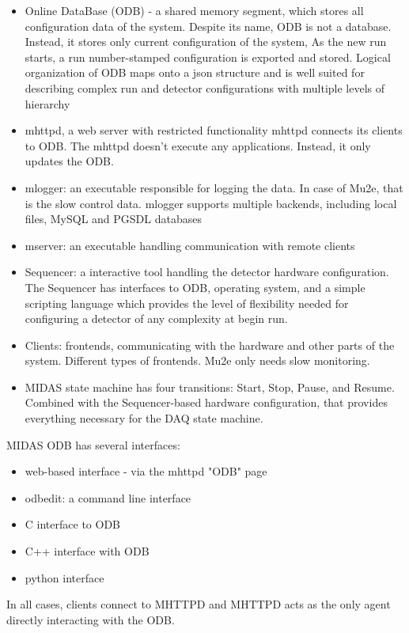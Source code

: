 \begin{itemize}
\item
  Online DataBase (ODB) - a shared memory segment, which stores all configuration data of the system.
  Despite its name, ODB is not a database. Instead, it stores only current configuration
  of the system, As the new run starts, a run number-stamped configuration is exported and stored.
  Logical organization of ODB maps onto a json structure and is well suited for describing
  complex run and detector configurations with multiple levels of hierarchy
\item 
  mhttpd, a web server with restricted functionality
  mhttpd connects its clients to ODB. 
  The mhttpd doesn't execute any applications. Instead, it only updates the ODB.
\item
  mlogger: an executable responsible for logging the data. In case of Mu2e, that is the slow control data.
  mlogger supports multiple backends, including local files, MySQL and PGSDL databases
\item
  mserver: an executable handling communication with remote clients
\item
  Sequencer: a interactive tool handling the detector hardware configuration.
  The Sequencer has interfaces to ODB, operating system, and a simple scripting language
  which provides the level of flexibility needed for configuring a detector of any complexity
  at begin run.
\item
  Clients: frontends, communicating with the hardware and other
  parts of the system. Different types of frontends. Mu2e only needs slow monitoring.
\item
  MIDAS state machine has four transitions: Start, Stop, Pause, and Resume.
  Combined with the Sequencer-based hardware configuration, that provides everything
  necessary for the DAQ state machine.
\end{itemize}

MIDAS ODB has several interfaces:
\begin{itemize}
\item 
  web-based interface - via the mhttpd "ODB" page
\item
  odbedit: a command line interface
\item
  C interface to ODB
\item
  C++ interface with ODB
\item
  python interface
\end{itemize}

In all cases, clients connect to MHTTPD and MHTTPD acts as
the only agent directly interacting with the ODB.

